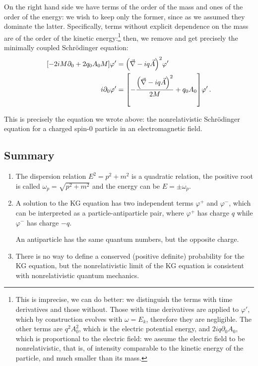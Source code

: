 \documentclass[main.tex]{subfiles}
\begin{document}
On the right hand side we have terms of the order of the mass and ones of the order of the energy: we wish to keep only the former, since as we assumed they dominate the latter. Specifically, terms without explicit dependence on the mass are of the order of the kinetic energy:\footnote{This is imprecise, we can do better: we distinguish the terms with time derivatives and those without. 
Those with time derivatives are applied to \(\varphi'\), which by construction evolves with \(\omega = E_k\), therefore they are negligible. 
The other terms are \(q^2 A_0^2\), which is the electric potential energy, and  \(2iq \partial_0 A_0 \), which is proportional to the electric field: we assume the electric field to be nonrelativistic, that is, of intensity comparable to the kinetic energy of the particle, and much smaller than its mass.  
}
then, we remove and get precisely the minimally coupled Schrödinger equation:
%
\begin{subequations}
\begin{align}
\qty[- 2 iM \partial_0 + 2 q_0 A_0 M ] \varphi' &= \qty(\vec{\nabla} - iq \vec{A})^2 \varphi^{\prime }  \\
i \partial_0 \varphi' &= \qty[- \frac{ \qty(\vec{\nabla} - i q \vec{A})^2}{2M} + q_0 A_0 ] \varphi'
\,.
\end{align}
\end{subequations}
%

This is precisely the equation we wrote above: the nonrelativistic Schrödinger equation for a charged spin-0 particle in an electromagnetic field. 

\subsection{Summary}

\begin{enumerate}
  \item The dispersion relation \(E^2 = p^2+m^2\) is a quadratic relation, the positive root is called \(\omega_{p} = \sqrt{p^2+m^2}\) and the energy can be \(E = \pm \omega_{p}\). 
  \item A solution to the KG equation has two independent terms \(\varphi^{+}\) and \(\varphi^{-}\), which can be interpreted as a particle-antiparticle pair, where \(\varphi^{+}\) has charge \(q\) while \(\varphi^{-}\) has charge \(-q\). 
  
  An antiparticle has the same quantum numbers, but the opposite charge. 
  \item There is no way to define a conserved (positive definite) probability for the KG equation, but the nonrelativistic limit of the KG equation is consistent with nonrelativistic quantum mechanics. 
\end{enumerate}
\end{document}
